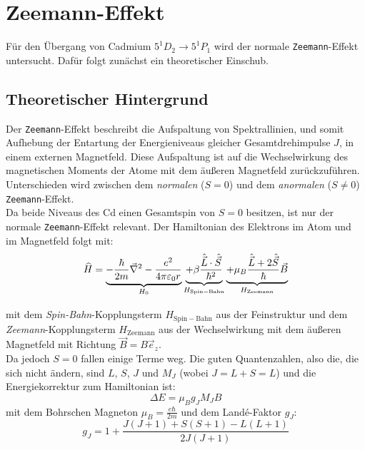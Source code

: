 \chapter{Zeemann-Effekt}
Für den Übergang von Cadmium $5^1D_2 \rightarrow 5^1P_1$ wird der normale \texttt{Zeemann}-Effekt untersucht. Dafür folgt zunächst ein theoretischer Einschub.
\section{Theoretischer Hintergrund}

Der \texttt{Zeemann}-Effekt beschreibt die Aufspaltung von Spektrallinien, und somit Aufhebung der Entartung der Energieniveaus gleicher Gesamtdrehimpulse $J$, in einem externen Magnetfeld. 
Diese Aufspaltung ist auf die Wechselwirkung des magnetischen Moments der Atome mit dem äußeren Magnetfeld zurückzuführen.
Unterschieden wird zwischen dem \textit{normalen} ($S=0$) und dem \textit{anormalen} ($S\neq 0$) \texttt{Zeemann}-Effekt.\\
Da beide Niveaus des Cd einen Gesamtspin von $S=0$ besitzen, ist nur der normale \texttt{Zeemann}-Effekt relevant.
Der Hamiltonian des Elektrons im Atom und im Magnetfeld folgt mit:
\begin{equation}
    \widehat{H}= 
    \underbrace{-\frac{\hbar}{2m}\vec{\nabla}^2 
    -\frac{e^2}{4\pi\varepsilon_0 r}}_{\raisebox{1.5ex}{\scriptsize $H_\mathrm{0}$}} 
    \underbrace{+\beta\frac{\hat{\vec{L}}\cdot\hat{\vec{S}}}{\hbar^2}}_{\raisebox{1.5ex}{\scriptsize $H_{\mathrm{Spin-Bahn}}$}}
    \underbrace{+\mu_B\frac{\hat{\vec{L}}+2\hat{\vec{S}}}{\hbar}\vec{B}}_{\raisebox{1.5ex}{\scriptsize $H_{\mathrm{Zeemann}}$}}
\end{equation}
mit dem \textit{Spin-Bahn}-Kopplungsterm $H_{\mathrm{Spin-Bahn}}$ aus der Feinstruktur und dem \textit{Zeemann}-Kopplungsterm $H_{\mathrm{Zeemann}}$ aus der 
Wechselwirkung mit dem äußeren Magnetfeld mit Richtung $\vec{B}=B\vec{e}_z$.\\
Da jedoch $S=0$ fallen einige Terme weg. Die guten Quantenzahlen, also die, die sich nicht ändern, sind $L$, $S$, $J$ und $M_J$ (wobei $J=L+S=L$) und die 
Energiekorrektur zum Hamiltonian ist:
\begin{equation}
    \Delta E = \mu_B g_J M_J B \label{equ:energieversch}
\end{equation}
mit dem Bohrschen Magneton $\mu_B = \frac{e\hbar}{2m}$ und dem Landé-Faktor $g_J$:
\begin{equation}
    g_J = 1 + \frac{J(J+1) + S(S+1) - L(L+1)}{2J(J+1)}
\end{equation}
